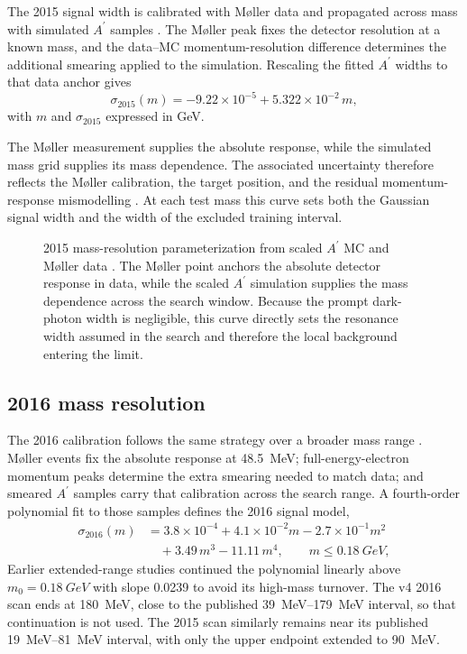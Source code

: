 The 2015 signal width is calibrated with M{\o}ller data and propagated across mass
with simulated $A^\prime$ samples \cite{HPS2015InternalNote}. The M{\o}ller peak fixes
the detector resolution at a known mass, and the data--MC momentum-resolution
difference determines the additional smearing applied to the simulation. Rescaling
the fitted $A^\prime$ widths to that data anchor gives
\begin{equation}
\sigma_{2015}(m) = -9.22\times10^{-5} + 5.322\times10^{-2}\,m,
\label{eq:sigma2015}
\end{equation}
with $m$ and $\sigma_{2015}$ expressed in GeV.

The M{\o}ller measurement supplies the absolute response, while the simulated mass
grid supplies its mass dependence. The associated uncertainty therefore reflects the
M{\o}ller calibration, the target position, and the residual momentum-response
mismodelling \cite{HPS2015DarkPhoton,HPS2015InternalNote}. At each test mass this curve
sets both the Gaussian signal width and the width of the excluded training interval.

\begin{figure}[H]
\centering
{}
\caption{2015 mass-resolution parameterization from scaled $A^\prime$ MC and M{\o}ller
data \cite{HPS2015InternalNote}. The M{\o}ller point anchors the absolute detector
response in data, while the scaled $A^\prime$ simulation supplies the mass dependence
across the search window. Because the prompt dark-photon width is negligible, this
curve directly sets the resonance width assumed in the search and therefore the local
background entering the limit.}
\label{fig:2015-resolution}
\end{figure}

\subsection{2016 mass resolution}
\label{sec:massres-2016}

The 2016 calibration follows the same strategy over a broader mass range
\cite{HPS2016BumpInternal,HPS2016PromptLong}. M{\o}ller events fix the absolute
response at \SI{48.5}{MeV}; full-energy-electron momentum peaks determine the extra
smearing needed to match data; and smeared $A^\prime$ samples carry that calibration
across the search range. A fourth-order polynomial fit to those samples defines the
2016 signal model,
\begin{align}
\sigma_{2016}(m) &= 3.8\times10^{-4} + 4.1\times10^{-2}m - 2.7\times10^{-1}m^2 \nonumber\\
&\quad + 3.49\,m^3 - 11.11\,m^4,
\qquad m \le \SI{0.18}{GeV},
\label{eq:sigma2016}
\end{align}
Earlier extended-range studies continued the polynomial linearly above
$m_0=\SI{0.18}{GeV}$ with slope \num{0.0239} to avoid its high-mass turnover. The v4
2016 scan ends at \SI{180}{MeV}, close to the published \SIrange{39}{179}{MeV}
interval, so that continuation is not used. The 2015 scan similarly remains near its
published \SIrange{19}{81}{MeV} interval, with only the upper endpoint extended to
\SI{90}{MeV}.

